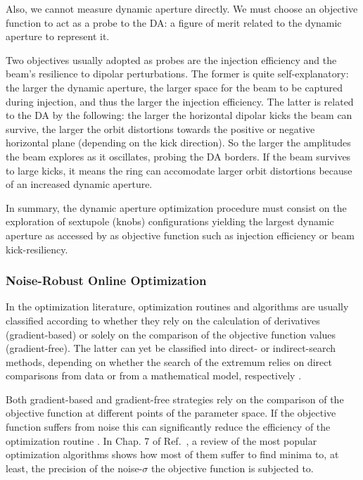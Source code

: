 Also, we cannot measure dynamic aperture directly. We must choose an objective function to act as a probe to the DA: a figure of merit related to the dynamic aperture to represent it.

Two objectives usually adopted as probes are the injection efficiency and the beam's resilience to dipolar perturbations. The former is quite self-explanatory: the larger the dynamic aperture, the larger space for the beam to be captured during injection, and thus the larger the injection efficiency. The latter is related to the DA by the following: the larger the horizontal dipolar kicks the beam can survive, the larger the orbit distortions towards the positive or negative horizontal plane (depending on the kick direction). So the larger the amplitudes the beam explores as it oscillates, probing the DA borders. If the beam survives to large kicks, it means the ring can accomodate larger orbit distortions because of an increased dynamic aperture.

In summary, the dynamic aperture optimization procedure must consist on the exploration of sextupole (knobs) configurations yielding the largest dynamic aperture as accessed by as objective function such as injection efficiency or beam kick-resiliency.
\subsubsection{Noise-Robust Online Optimization}
In the optimization literature, optimization routines and algorithms are usually classified according to whether they rely on the calculation of derivatives (gradient-based) or solely on the comparison of the objective function values (gradient-free). The latter can yet be classified into direct- or indirect-search methods, depending on whether the search of the extremum relies on direct comparisons from data or from a mathematical model, respectively \cite{numerical_recipes}.

Both gradient-based and gradient-free strategies rely on the comparison of the objective function at different points of the parameter space. If the objective function suffers from noise this can significantly reduce the efficiency of the optimization routine \cite{numerical_recipes, huang2019beam}. In Chap. 7 of Ref.~\cite{huang2019beam}, a review of the most popular optimization algorithms shows how most of them suffer to find minima to, at least, the precision of the noise-$\sigma$ the objective function is subjected to.

